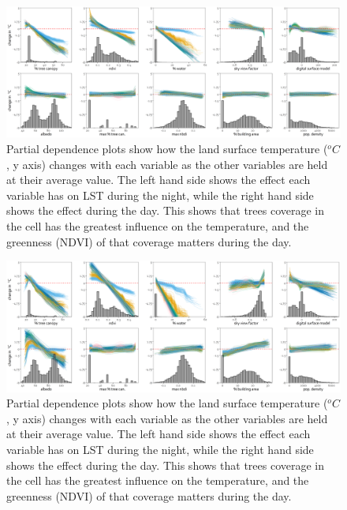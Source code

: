 \documentclass[final,3p,times,twocolumn,sort&compress]{elsarticle}
\begin{document}
\begin{figure}
    \centering
    \includegraphics[width=\linewidth]{fig/report/pdp_uncert_night_500.png}
    \caption{
    Partial dependence plots show how the land surface temperature ($^oC$, y axis) changes with each variable as the other variables are held at their average value. The left hand side shows the effect each variable has on LST during the night, while the right hand side shows the effect during the day. This shows that trees coverage in the cell has the greatest influence on the temperature, and the greenness (NDVI) of that coverage matters during the day.
    }
    \label{fig:pdp_night_500}
\end{figure}

\begin{figure}
    \centering
    \includegraphics[width=\linewidth]{fig/report/pdp_uncert_day_500.png}
    \caption{
    Partial dependence plots show how the land surface temperature ($^oC$, y axis) changes with each variable as the other variables are held at their average value. The left hand side shows the effect each variable has on LST during the night, while the right hand side shows the effect during the day. This shows that trees coverage in the cell has the greatest influence on the temperature, and the greenness (NDVI) of that coverage matters during the day.
    }
    \label{fig:pdp_day_500}
\end{figure}
\end{document}
